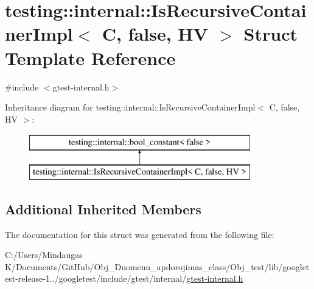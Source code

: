 \hypertarget{structtesting_1_1internal_1_1_is_recursive_container_impl_3_01_c_00_01false_00_01_h_v_01_4}{}\section{testing\+::internal\+::Is\+Recursive\+Container\+Impl$<$ C, false, HV $>$ Struct Template Reference}
\label{structtesting_1_1internal_1_1_is_recursive_container_impl_3_01_c_00_01false_00_01_h_v_01_4}


{\ttfamily \#include $<$gtest-\/internal.\+h$>$}

Inheritance diagram for testing\+::internal\+::Is\+Recursive\+Container\+Impl$<$ C, false, HV $>$\+:\begin{figure}[H]
\begin{center}
\leavevmode
\includegraphics[height=2.000000cm]{d8/dc4/structtesting_1_1internal_1_1_is_recursive_container_impl_3_01_c_00_01false_00_01_h_v_01_4}
\end{center}
\end{figure}
\subsection*{Additional Inherited Members}


The documentation for this struct was generated from the following file\+:\begin{DoxyCompactItemize}
\item 
C\+:/\+Users/\+Mindaugas K/\+Documents/\+Git\+Hub/\+Obj\+\_\+\+Duomenu\+\_\+apdorojimas\+\_\+class/\+Obj\+\_\+test/lib/googletest-\/release-\/1../googletest/include/gtest/internal/\mbox{\hyperlink{_obj__test_2lib_2googletest-release-1_88_81_2googletest_2include_2gtest_2internal_2gtest-internal_8h}{gtest-\/internal.\+h}}\end{DoxyCompactItemize}
